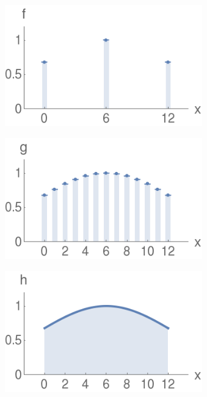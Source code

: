 \begin{figure}[ht]
   \centering
    \begin{subfigure}[b]{0.32\textwidth}
        \centering
        \includegraphics[width=0.94\textwidth]{Slike/discreteExample}
        \vspace{0mm}
        \caption{}
    \end{subfigure}
    \hspace{0mm}
    \begin{subfigure}[b]{0.32\textwidth}
        \centering
        \includegraphics[width=0.94\textwidth]{Slike/discreteExample2}
        \caption{}
    \end{subfigure}
    \hspace{0mm}
    \begin{subfigure}[b]{0.32\textwidth}
      \centering
      \includegraphics[width=0.94\textwidth]{Slike/discreteExample3}

\end{subfigure}
\end{figure}
